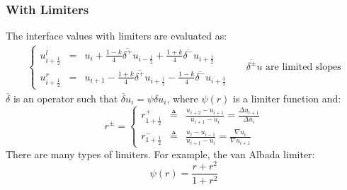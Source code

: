 \documentclass[11pt, a4paper]{article}
\begin{document}
\subsubsection{With Limiters}
The interface values with limiters are evaluated as:
\begin{equation}
    \begin{matrix}
        \left\{\begin{array}{lcl}
            u_{i+\frac{1}{2}}^l & = & u_i+\frac{1-k}{4}\overline{\delta^+} u_{i-\frac{1}{2}}+\frac{1+k}{4}\overline{\delta^-} u_{i+\frac{1}{2}} \\
            u_{i+\frac{1}{2}}^r & = & u_{i+1}-\frac{1+k}{4}\overline{\delta^+} u_{i+\frac{1}{2}}-\frac{1-k}{4}\overline{\delta^-} u_{i+\frac{3}{2}}
        \end{array}\right. && {\overline{\delta^\pm}} u\text{ are limited slopes}
    \end{matrix}
\end{equation}
$\overline{\delta}$ is an operator such that $\overline{\delta}u_i=\psi\delta u_i$, where $\psi\left(r\right)$ is a limiter function and:
\begin{equation}
    r^\pm=\left\{\begin{array}{ccc}
        r_{1+\frac{1}{2}}^+ & \triangleq & \displaystyle\frac{u_{i+2}-u_{i+1}}{u_{i+1}-u_i}=\frac{\Delta u_{i+1}}{\Delta u_i} \\
        r_{1+\frac{1}{2}}^- & \triangleq & \displaystyle\frac{u_{i}-u_{i-1}}{u_{i+1}-u_i}=\frac{\nabla u_{i}}{\nabla u_{i+1}}
    \end{array}\right.
\end{equation}
There are many types of limiters. For example, the van Albada limiter:
\begin{equation}
    \psi\left(r\right)=\frac{r+r^2}{1+r^2}
\end{equation}

\newpage
\end{document}
